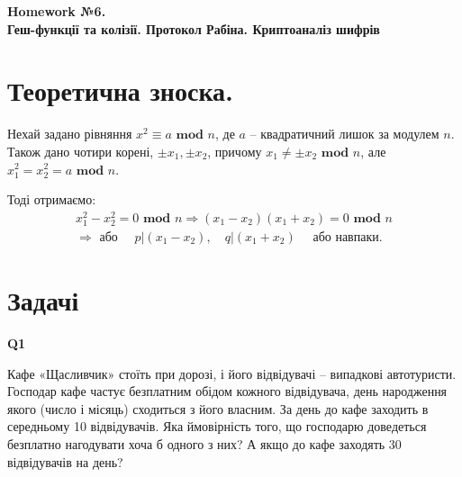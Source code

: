 \documentclass{../../test-template}
\begin{document}
\begin{center}
    \textbf{\Huge{Homework №6.} \\ \large Геш-функції та колізії. Протокол Рабіна. Криптоаналіз шифрів}
\end{center}
\section*{Теоретична зноска.}
\begin{tcolorbox}[breakable, colback=gray!10!white,fonttitle=\bfseries,colframe=purple!80!black,title=Задача про 4 корені]
Нехай задано рівняння $x^2\equiv a\textbf{ mod } n$, де $a$ -- квадратичний лишок за модулем $n$. Також дано чотири корені, $\pm x_1,\pm x_2$, причому $x_1\neq \pm x_2\textbf{ mod } n$, але $x_1^2=x_2^2=a\textbf{ mod } n$.

Тоді отримаємо:
\begin{align*}
    x_1^2-x_2^2=0\textbf{ mod } n \Rightarrow (x_1-x_2)(x_1+x_2)=0\textbf{ mod } n \\
    \Rightarrow \texttt{ або }\quad p|(x_1-x_2),\quad q|(x_1+x_2) \quad\texttt{ або навпаки.}
\end{align*} 
\end{tcolorbox}
\section*{Задачі}

\begin{tcolorbox}[lowerbox=invisible,colback=white]
    \begin{minipage}{0.1\textwidth}
        \raggedright
        \vspace*{\fill}
            \textbf{Q1}
        \vspace*{\fill}
        \end{minipage}
        \begin{minipage}{0.75\textwidth}
Кафе «Щасливчик» стоїть при дорозі, і його відвідувачі -- випадкові автотуристи. Господар кафе частує безплатним обідом кожного відвідувача, день народження якого (число і місяць) сходиться з його власним. За день до кафе заходить в середньому 10 відвідувачів. Яка ймовірність того, що господарю доведеться безплатно нагодувати хоча б одного з них? А якщо до кафе заходять 30 відвідувачів на день?
    \end{minipage}
\end{tcolorbox}
\end{document}
